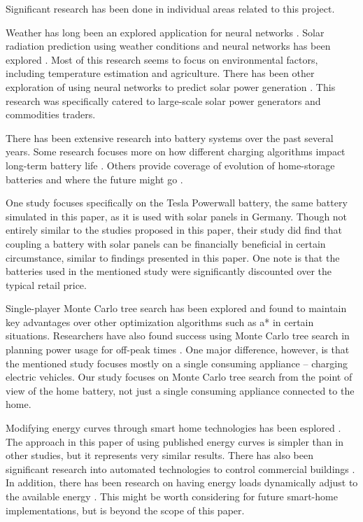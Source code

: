 Significant research has been done in individual areas related to this project.

Weather has long been an explored application for neural networks \cite{baboo_efficient_2010}. Solar radiation prediction using weather conditions and neural networks has been explored \cite{rehman_artificial_2008} \cite{behrang_potential_2010} \cite{soares_modeling_2004}. Most of this research seems to focus on environmental factors, including temperature estimation and agriculture. There has been other exploration of using neural networks to predict solar power generation \cite{chen_online_2011}. This research was specifically catered to large-scale solar power generators and commodities traders.

There has been extensive research into battery systems over the past several years. Some research focuses more on how different charging algorithms impact long-term battery life \cite{bila_grid_2016}. Others provide coverage of evolution of home-storage batteries and where the future might go \cite{restrepo_residential_2015}.

One study \cite{truong_economics_2016} focuses specifically on the Tesla Powerwall battery, the same battery simulated in this paper, as it is used with solar panels in Germany. Though not entirely similar to the studies proposed in this paper, their study did find that coupling a battery with solar panels can be financially beneficial in certain circumstance, similar to findings presented in this paper. One note is that the batteries used in the mentioned study were significantly discounted over the typical retail price.

Single-player Monte Carlo tree search has been explored \cite{schadd_single-player_2012} and found to maintain key advantages over other optimization algorithms such as a* in certain situations. Researchers have also found success using Monte Carlo tree search in planning power usage for off-peak times \cite{golpayegani_collaborative_2015}. One major difference, however, is that the mentioned study focuses mostly on a single consuming appliance -- charging electric vehicles. Our study focuses on Monte Carlo tree search from the point of view of the home battery, not just a single consuming appliance connected to the home.

Modifying energy curves through smart home technologies has been esplored \cite{barker_smartcap:_2012}. The approach in this paper of using published energy curves is simpler than in other studies, but it represents very similar results. There has also been significant research into automated technologies to control commercial buildings \cite{weng_buildingdepot_2013}. In addition, there has been research on having energy loads dynamically adjust to the available energy \cite{verma_brownmap:_2010}. This might be worth considering for future smart-home implementations, but is beyond the scope of this paper.